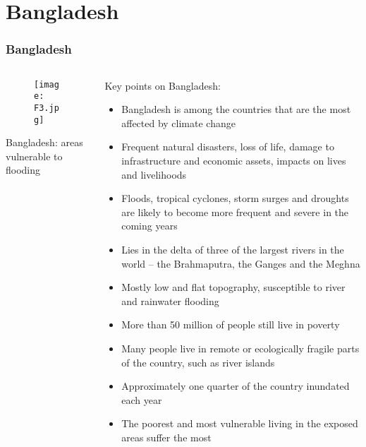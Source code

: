 \documentclass[pdflatex,compress,8pt,
	xcolor={dvipsnames,dvipsnames,svgnames,x11names,table},
	hyperref={colorlinks = true,breaklinks = true, urlcolor = NavyBlue, breaklinks = true}]{beamer}
\begin{document}
\section{Bangladesh}
\begin{frame}\frametitle{Bangladesh}
\begin{minipage}[0.4\textheight]{\textwidth}
\begin{columns}[T]
\begin{column}{0.5\textwidth}
\vspace{2em}
\begin{figure}[H]
	\centering
		\texttt{[image: F3.jpg]}
\end{figure}
\footnotesize{Bangladesh: areas vulnerable to flooding}
\end{column}
\begin{column}{0.5\textwidth}
\vspace{2em} 
Key points on Bangladesh: 
\footnotesize{
\begin{itemize}
	\item Bangladesh is among the countries that are the most affected by climate change
	\item Frequent natural disasters, loss of life, damage to infrastructure and economic assets, impacts on lives and livelihoods
	\item Floods, tropical cyclones, storm surges and droughts are likely to become more frequent and severe in the coming years
	\item Lies in the delta of three of the largest rivers in the world – the Brahmaputra, the Ganges and the Meghna
	\item Mostly low and flat topography, susceptible to river and rainwater flooding
	\item More than 50 million of people still live in poverty
	\item Many people live in remote or ecologically fragile parts of the country, such as river islands
	\item Approximately one quarter of the country inundated each year
	\item The poorest and most vulnerable living in the exposed areas suffer the most
\end{itemize}
}
\end{column}
\end{columns}
\end{minipage}
\end{frame}
\end{document}
